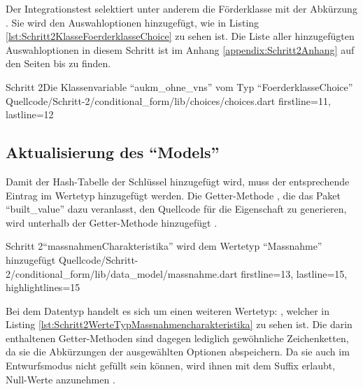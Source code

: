 Der Integrationstest selektiert unter anderem die Förderklasse mit der Abkürzung . Sie wird den Auswahloptionen hinzugefügt, wie in Listing \ref{lst:Schritt2KlasseFoerderklasseChoice} zu sehen ist.
Die Liste aller hinzugefügten Auswahloptionen in diesem Schritt ist im Anhang \ref{appendix:Schritt2Anhang} auf den Seiten \pageref{lst:Schritt2FoerderklasseChoicesKategorieChoices} bis \pageref{lst:Schritt2hauptzielsetzungLandChoices} zu finden.

\begin{alexlisting}{Schritt 2}{Die Klassenvariable \enquote{aukm_ohne_vns} vom Typ \enquote{FoerderklasseChoice}}
  {Quellcode/Schritt-2/conditional_form/lib/choices/choices.dart}
  {firstline=11, lastline=12}
  \label{lst:Schritt2KlasseFoerderklasseChoice}
\end{alexlisting}

\subsection{Aktualisierung des \enquote{Models}}

Damit der Hash-Tabelle der Schlüssel  hinzugefügt wird, muss der entsprechende Eintrag im Wertetyp  hinzugefügt werden.
Die Getter-Methode , die das Paket \enquote{built_value} dazu veranlasst, den Quellcode für die Eigenschaft zu generieren, wird unterhalb der Getter-Methode  hinzugefügt .

\begin{alexlisting}{Schritt 2}{\enquote{massnahmenCharakteristika} wird dem Wertetyp \enquote{Massnahme} hinzugefügt}
  {Quellcode/Schritt-2/conditional_form/lib/data_model/massnahme.dart}
  {firstline=13, lastline=15, highlightlines={15}}
  \label{lst:Schritt2massnahmenCharakteristikaWirdMMassnahmeHinzugefuegt}
\end{alexlisting}

Bei dem Datentyp handelt es sich um einen weiteren Wertetyp: , welcher in Listing \ref{lst:Schritt2WerteTypMassnahmencharakteristika} zu sehen ist.
Die darin enthaltenen Getter-Methoden sind dagegen lediglich gewöhnliche Zeichenketten, da sie die Abkürzungen der ausgewählten Optionen abspeichern.
Da sie auch im Entwurfsmodus nicht gefüllt sein können, wird ihnen mit dem Suffix  erlaubt, Null-Werte anzunehmen .

